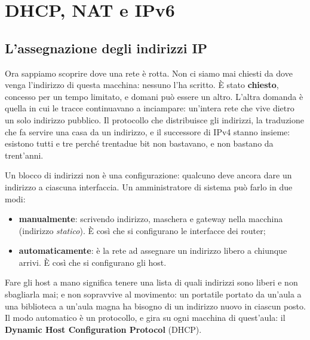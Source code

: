 \chapter{DHCP, NAT e IPv6}

\section{L'assegnazione degli indirizzi IP}

Ora sappiamo scoprire dove una rete è rotta. Non ci siamo mai chiesti da dove venga l'indirizzo di questa macchina:
nessuno l'ha scritto. È stato \textbf{chiesto}, concesso per un tempo limitato, e domani può essere un altro. L'altra
domanda è quella in cui le tracce continuavano a inciampare: un'intera rete che vive dietro un solo indirizzo pubblico. Il
protocollo che distribuisce gli indirizzi, la traduzione che fa servire una casa da un indirizzo, e il successore di IPv4
stanno insieme: esistono tutti e tre perché trentadue bit non bastavano, e non bastano da trent'anni.

Un blocco di indirizzi non è una configurazione: qualcuno deve ancora dare un indirizzo a ciascuna interfaccia. Un
amministratore di sistema può farlo in due modi:

\begin{itemize}
    \item \textbf{manualmente}: scrivendo indirizzo, maschera e gateway nella macchina (indirizzo \emph{statico}). È così che
          si configurano le interfacce dei router;
    \item \textbf{automaticamente}: è la rete ad assegnare un indirizzo libero a chiunque arrivi. È così che si configurano
          gli host.
\end{itemize}

Fare gli host a mano significa tenere una lista di quali indirizzi sono liberi e non sbagliarla mai; e non sopravvive al
movimento: un portatile portato da un'aula a una biblioteca a un'aula magna ha bisogno di un indirizzo nuovo in ciascun posto.
Il modo automatico è un protocollo, e gira su ogni macchina di quest'aula: il \textbf{Dynamic Host Configuration Protocol}
(DHCP).


